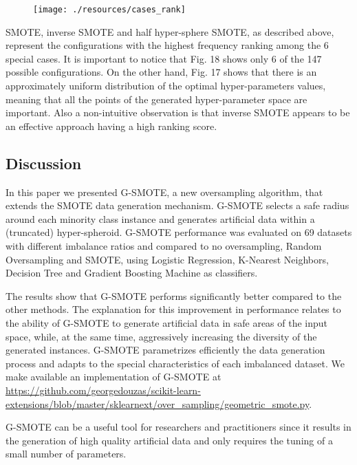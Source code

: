 \documentclass[parskip=full]{scrartcl}
\begin{document}
\begin{figure}[H]
	\centering
	\texttt{[image: ./resources/cases\_rank]}
\end{figure}

SMOTE, inverse SMOTE and half hyper-sphere SMOTE, as described above, represent
the configurations with the highest frequency ranking among the 6 special cases.
It is important to notice that Fig. 18 shows only  6 of the 147 possible
configurations. On the other hand, Fig. 17 shows that there is an approximately
uniform distribution of the optimal hyper-parameters values, meaning that all
the points of the generated hyper-parameter space are important. Also a
non-intuitive observation is that inverse SMOTE appears to be an effective
approach having a high ranking score.

\subsection{Discussion}

In this paper we presented G-SMOTE, a new oversampling algorithm, that extends
the SMOTE data generation mechanism. G-SMOTE selects a safe radius around each
minority class instance and generates artificial data within a (truncated)
hyper-spheroid. G-SMOTE performance was evaluated on 69 datasets with different
imbalance ratios and compared to no oversampling, Random Oversampling and SMOTE,
using Logistic Regression, K-Nearest Neighbors, Decision Tree and Gradient
Boosting Machine as classifiers.

The results show that G-SMOTE performs significantly better compared to the
other methods. The explanation for this improvement in performance relates to
the ability of G-SMOTE to generate artificial data in safe areas of the input
space, while, at the same time, aggressively increasing the diversity of the
generated instances. G-SMOTE parametrizes efficiently the data generation
process and adapts to the special characteristics of each imbalanced dataset. We
make available an implementation of G-SMOTE at
\url{https://github.com/georgedouzas/scikit-learn-extensions/blob/master/sklearnext/over_sampling/geometric_smote.py}.

G-SMOTE can be a useful tool for researchers and practitioners since it results
in the generation of high quality artificial data and only requires the tuning
of a small number of parameters.



\end{document}
